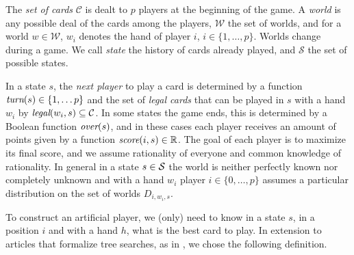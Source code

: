 \documentclass[runningheads]{llncs}
\begin{document}

The \emph{set of cards} $\mathcal{C}$ is dealt to $p$ players at the beginning of the game. A \emph{world} is any possible deal of the cards among the players, $\mathcal{W}$ the set of worlds, and for a world $w \in \mathcal{W}$, $w_i$ denotes the hand of player $i$, $i \in \{1,\ldots,p\}$. 
Worlds change during a game.
We call \emph{state} the history of cards already played, and $\mathcal{S}$ the set of possible states.

In a state $s$, the \emph{next player} to play a card is determined by a function $\mbox{\em turn}(s) \in \{1,\ldots p\}$ and the set of \emph{legal cards} that can be played in $s$ with a hand $w_i$ by $\mbox{\em legal}(w_i,s) \subseteq \mathcal{C}$. In some states the game ends, this is determined by a Boolean function $\mbox{\em over}(s)$, and in these cases each player receives an amount of points given by a function $\mbox{\em score}(i,s) \in \mathbb{R}$. The goal of each player is to maximize its final score, and we assume rationality of everyone and common knowledge of rationality. 
In general in a state $s \in {\cal S}$ the world is neither perfectly known nor completely unknown and with a hand $w_i$ player $i \in \{0,\ldots,p\}$ assumes a particular distribution on the set of worlds $D_{i,w_i,s}$. 

To construct an artificial player, we (only) need to know in a state $s$, in a position $i$ and with a hand $h$,  what is the best card to play. In extension to articles that formalize tree searches, as in \cite{calculating_pimc}, \cite{understanding_pimc} we chose the following definition. 
\end{document}

